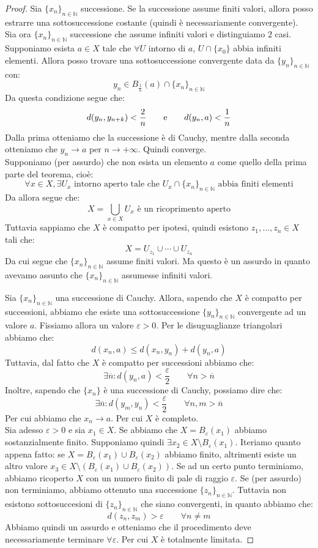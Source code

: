 \documentclass[11pt,a4paper,twoside]{article}
\newcommand{\vareps}{\varepsilon}
\theoremstyle{definition}
\begin{document}
\begin{proof}
	 Sia $\{x_n\}_{n \in \mathbb N}$ successione. Se la successione assume finiti valori, allora posso estrarre una sottosuccessione costante (quindi è necessariamente convergente).\\
	Sia ora $\{x_n\}_{n \in \mathbb N}$ successione che assume infiniti valori e distinguiamo $2$ casi.\\
	Supponiamo esista $a \in X$ tale che $\forall U$ intorno di $a$, $U \cap \{x_0\}$ abbia infiniti elementi. Allora posso trovare una sottosuccessione convergente data da $\{y_n\}_{n \in \mathbb N}$ con:
	\[ y_n \in B_{\frac 1n}(a) \cap \{x_n\}_{n\in \mathbb N} \]
	Da questa condizione segue che:
	\[ d(y_n, y_{n+k})<\frac 2n \qquad \text e \qquad d(y_n, a)< \frac 1n\]
	Dalla prima otteniamo che la successione è di Cauchy, mentre dalla seconda otteniamo che $y_n \to a$ per $n\to +\infty$. Quindi converge.\\
	Supponiamo (per assurdo) che non esista un elemento $a$ come quello della prima parte del teorema, cioè:
	\[ \forall x \in X, \exists U_x \text{ intorno aperto tale che }U_x \cap \{x_n\}_{n \in \mathbb N}\text{ abbia finiti elementi} \]
	Da allora segue che:
	\[ X = \bigcup_{x \in X}U_x \text{ è un ricoprimento aperto} \]
	Tuttavia sappiamo che $X$ è compatto per ipotesi, quindi esistono $z_1,...,z_n \in X$ tali che:
	\[ X = U_{z_1}\cup \cdots \cup U_{z_n} \]
	Da cui segue che $\{x_n\}_{n\in \mathbb N}$ assume finiti valori. Ma questo è un assurdo in quanto avevamo assunto che $\{x_n\}_{n \in \mathbb N}$ assumesse infiniti valori.

	 Sia $\{x_n\}_{n\in \mathbb N}$ una successione di Cauchy. Allora, sapendo che $X$ è compatto per successioni, abbiamo che esiste una sottosuccessione $\{y_n\}_{n \in \mathbb N}$ convergente ad un valore $a$. Fissiamo allora un valore $\vareps>0$. Per le disuguaglianze triangolari abbiamo che:
	\[ d(x_n,a) \leq d(x_n, y_n) + d(y_n, a) \]
	Tuttavia, dal fatto che $X$ è compatto per successioni abbiamo che:
	\[ \exists \overline n: d(y_n,a) < \frac \vareps 2\qquad \forall n > \overline n \]
	Inoltre, sapendo che $\{x_n\}$ è una successione di Cauchy, possiamo dire che:
	\[ \exists \overline n : d(y_m, y_n) < \frac \vareps 2\qquad \forall n,m > \overline n \]
	Per cui abbiamo che $x_n \to a$. Per cui $X$ è completo.\\
	Sia adesso $\vareps >0$ e sia $x_1 \in X$. Se abbiamo che $X = B_\vareps (x_1)$ abbiamo sostanzialmente finito. Supponiamo quindi $\exists x_2 \in X \setminus B_\vareps (x_1)$. Iteriamo quanto appena fatto: se $X = B_\vareps(x_1)\cup B_\vareps(x_2)$ abbiamo finito, altrimenti esiste un altro valore $x_3 \in X \setminus (B_\vareps(x_1)\cup B_\vareps(x_2))$. Se ad un certo punto terminiamo, abbiamo ricoperto $X$ con un numero finito di pale di raggio $\vareps$. Se (per assurdo) non terminiamo, abbiamo ottenuto una successione $\{z_n\}_{n \in \mathbb N}$. Tuttavia non esistono sottosuccesioni di $\{z_n\}_{n \in \mathbb N}$ che siano convergenti, in quanto abbiamo che:
	\[ d(z_n,z_m) > \vareps\qquad \forall n \neq m \]
	Abbiamo quindi un assurdo e otteniamo che il procedimento deve necessariamente terminare $\forall \vareps$. Per cui $X$ è totalmente limitata.


\end{proof}
\end{document}
